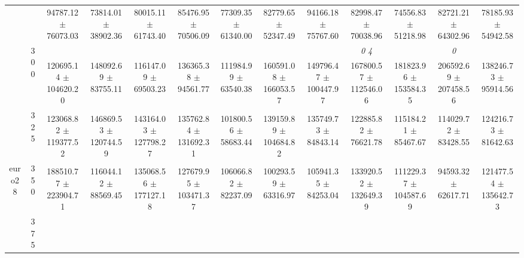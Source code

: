 \begin{table}[h]
{\begin{tabular}{
        ccccccccccccc}
 & & \cellcolor[HTML]{EFEFEF} 94787.12 $\pm$ 76073.03& \cellcolor[HTML]{EFEFEF} 73814.01 $\pm$ 38902.36& \cellcolor[HTML]{EFEFEF} 80015.11 $\pm$ 61743.40& \cellcolor[HTML]{EFEFEF} 85476.95 $\pm$ 70506.09& \cellcolor[HTML]{EFEFEF} 77309.35 $\pm$ 61340.00& \cellcolor[HTML]{EFEFEF} 82779.65 $\pm$ 52347.49& \cellcolor[HTML]{EFEFEF} 94166.18 $\pm$ 75767.60& \cellcolor[HTML]{EFEFEF} 82998.47 $\pm$ 70038.96& \cellcolor[HTML]{EFEFEF} 74556.83 $\pm$ 51218.98& \cellcolor[HTML]{EFEFEF} 82721.21 $\pm$ 64302.96& \cellcolor[HTML]{EFEFEF} 78185.93 $\pm$ 54942.58 \\ 
 & \multirow{2}{*}{300}& & & & & & & & \textit{ 0 4 }& & \textit{ 0 }&  \\ 
 & & 120695.14 $\pm$ 104620.20& 148092.69 $\pm$ 83755.11& 116147.09 $\pm$ 69503.23& 136365.38 $\pm$ 94561.77& 111984.99 $\pm$ 63540.38& 160591.08 $\pm$ 166053.57& 149796.47 $\pm$ 100447.97& 167800.57 $\pm$ 112546.06& 181823.96 $\pm$ 153584.35& 206592.69 $\pm$ 207458.56& 138246.73 $\pm$ 95914.56 \\ 
 & \multirow{2}{*}{325}& \cellcolor[HTML]{EFEFEF} & \cellcolor[HTML]{EFEFEF} & \cellcolor[HTML]{EFEFEF} & \cellcolor[HTML]{EFEFEF} & \cellcolor[HTML]{EFEFEF} & \cellcolor[HTML]{EFEFEF} & \cellcolor[HTML]{EFEFEF} & \cellcolor[HTML]{EFEFEF} & \cellcolor[HTML]{EFEFEF} & \cellcolor[HTML]{EFEFEF} & \cellcolor[HTML]{EFEFEF}  \\ 
 & & \cellcolor[HTML]{EFEFEF} 123068.82 $\pm$ 119377.52& \cellcolor[HTML]{EFEFEF} 146869.53 $\pm$ 120744.59& \cellcolor[HTML]{EFEFEF} 143164.03 $\pm$ 127798.27& \cellcolor[HTML]{EFEFEF} 135762.84 $\pm$ 131692.31& \cellcolor[HTML]{EFEFEF} 101800.56 $\pm$ 58683.44& \cellcolor[HTML]{EFEFEF} 139159.89 $\pm$ 104684.82& \cellcolor[HTML]{EFEFEF} 135749.73 $\pm$ 84843.14& \cellcolor[HTML]{EFEFEF} 122885.82 $\pm$ 76621.78& \cellcolor[HTML]{EFEFEF} 115184.21 $\pm$ 85467.67& \cellcolor[HTML]{EFEFEF} 114029.72 $\pm$ 83428.55& \cellcolor[HTML]{EFEFEF} 124216.73 $\pm$ 81642.63 \\ 
 \multirow{4}{*}{euro28} & \multirow{2}{*}{350}& & & & & & & & & & &  \\ 
 & & 188510.77 $\pm$ 223904.71& 116044.12 $\pm$ 88569.45& 135068.56 $\pm$ 177127.18& 127679.95 $\pm$ 103471.37& 106066.82 $\pm$ 82237.09& 100293.59 $\pm$ 63316.97& 105941.35 $\pm$ 84253.04& 133920.52 $\pm$ 132649.39& 111229.37 $\pm$ 104587.69& 94593.32 $\pm$ 62617.71& 121477.54 $\pm$ 135642.73 \\ 
 & \multirow{2}{*}{375}& \cellcolor[HTML]{EFEFEF} & \cellcolor[HTML]{EFEFEF} & \cellcolor[HTML]{EFEFEF} & \cellcolor[HTML]{EFEFEF} & \cellcolor[HTML]{EFEFEF} & \cellcolor[HTML]{EFEFEF} & \cellcolor[HTML]{EFEFEF} & \cellcolor[HTML]{EFEFEF} & \cellcolor[HTML]{EFEFEF} & \cellcolor[HTML]{EFEFEF} & \cellcolor[HTML]{EFEFEF}  \\ 

\end{tabular}}
\end{table}

